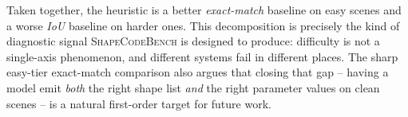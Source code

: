 Taken together, the heuristic is a better \emph{exact-match} baseline on easy
scenes and a worse \emph{IoU} baseline on harder ones. This decomposition is
precisely the kind of diagnostic signal \textsc{ShapeCodeBench} is designed to
produce: difficulty is not a single-axis phenomenon, and different systems
fail in different places. The sharp easy-tier exact-match comparison also
argues that closing that gap -- having a model emit \emph{both} the right
shape list \emph{and} the right parameter values on clean scenes -- is a
natural first-order target for future work.
